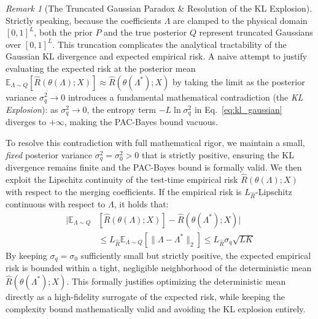 \documentclass{article}
\theoremstyle{plain}
\theoremstyle{definition}
\theoremstyle{remark}
\newtheorem{remark}{Remark}
\begin{document}
\begin{remark}[The Truncated Gaussian Paradox \& Resolution of the KL Explosion]
Strictly speaking, because the coefficients $\Lambda$ are clamped to the physical domain $[0, 1]^L$, both the prior $P$ and the true posterior $Q$ represent truncated Gaussians over $[0, 1]^L$. This truncation complicates the analytical tractability of the Gaussian KL divergence and expected empirical risk. A naive attempt to justify evaluating the expected risk at the posterior mean $\mathbb{E}_{\Lambda \sim Q} [\hat{R}(\theta(\Lambda); X)] \approx \hat{R}(\theta(\Lambda^*); X)$ by taking the limit as the posterior variance $\sigma_q^2 \to 0$ introduces a fundamental mathematical contradiction (the \emph{KL Explosion}): as $\sigma_q^2 \to 0$, the entropy term $-L \ln \sigma_q^2$ in Eq.~\ref{eq:kl_gaussian} diverges to $+\infty$, making the PAC-Bayes bound vacuous. 

To resolve this contradiction with full mathematical rigor, we maintain a small, \emph{fixed} posterior variance $\sigma_q^2 = \sigma_0^2 > 0$ that is strictly positive, ensuring the KL divergence remains finite and the PAC-Bayes bound is formally valid. We then exploit the Lipschitz continuity of the test-time empirical risk $\hat{R}(\theta(\Lambda); X)$ with respect to the merging coefficients. If the empirical risk is $L_{\hat{R}}$-Lipschitz continuous with respect to $\Lambda$, it holds that:
\begin{equation}
\begin{aligned}
\Big| \mathbb{E}_{\Lambda \sim Q} &[\hat{R}(\theta(\Lambda); X)] - \hat{R}(\theta(\Lambda^*); X) \Big| \\
&\le L_{\hat{R}} \mathbb{E}_{\Lambda \sim Q} [\|\Lambda - \Lambda^*\|_2] \le L_{\hat{R}} \sigma_q \sqrt{L K}
\end{aligned}
\end{equation}
By keeping $\sigma_q = \sigma_0$ sufficiently small but strictly positive, the expected empirical risk is bounded within a tight, negligible neighborhood of the deterministic mean $\hat{R}(\theta(\Lambda^*); X)$. This formally justifies optimizing the deterministic mean directly as a high-fidelity surrogate of the expected risk, while keeping the complexity bound mathematically valid and avoiding the KL explosion entirely.
\end{remark}
\end{document}
